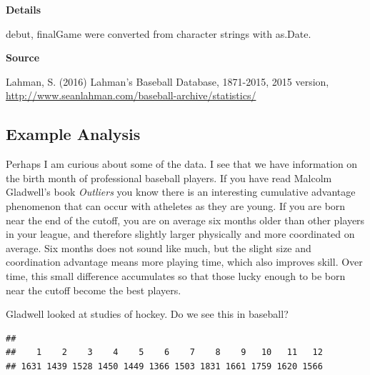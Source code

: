 \documentclass[]{book}
\newenvironment{Shaded}{\begin{snugshade}}{\end{snugshade}}
\newcommand{\DataTypeTok}[1]{\textcolor[rgb]{0.13,0.29,0.53}{#1}}
\newcommand{\DecValTok}[1]{\textcolor[rgb]{0.00,0.00,0.81}{#1}}
\newcommand{\KeywordTok}[1]{\textcolor[rgb]{0.13,0.29,0.53}{\textbf{#1}}}
\newcommand{\NormalTok}[1]{#1}
\newcommand{\OperatorTok}[1]{\textcolor[rgb]{0.81,0.36,0.00}{\textbf{#1}}}
\newcommand{\StringTok}[1]{\textcolor[rgb]{0.31,0.60,0.02}{#1}}
\theoremstyle{definition}
\theoremstyle{definition}
\theoremstyle{definition}
\theoremstyle{remark}
\begin{document}
\textbf{Details}

debut, finalGame were converted from character strings with as.Date.

\textbf{Source}

Lahman, S. (2016) Lahman's Baseball Database, 1871-2015, 2015 version,
\url{http://www.seanlahman.com/baseball-archive/statistics/}

\hypertarget{example-analysis}{%
\subsection{Example Analysis}\label{example-analysis}}

Perhaps I am curious about some of the data. I see that we have
information on the birth month of professional baseball players. If you
have read Malcolm Gladwell's book \emph{Outliers} you know there is an
interesting cumulative advantage phenomenon that can occur with
atheletes as they are young. If you are born near the end of the cutoff,
you are on average six months older than other players in your league,
and therefore slightly larger physically and more coordinated on
average. Six months does not sound like much, but the slight size and
coordination advantage means more playing time, which also improves
skill. Over time, this small difference accumulates so that those lucky
enough to be born near the cutoff become the best players.

Gladwell looked at studies of hockey. Do we see this in baseball?

\begin{Shaded}
\end{Shaded}

\begin{verbatim}
## 
##    1    2    3    4    5    6    7    8    9   10   11   12 
## 1631 1439 1528 1450 1449 1366 1503 1831 1661 1759 1620 1566
\end{verbatim}

\begin{Shaded}
\end{Shaded}
\end{document}

